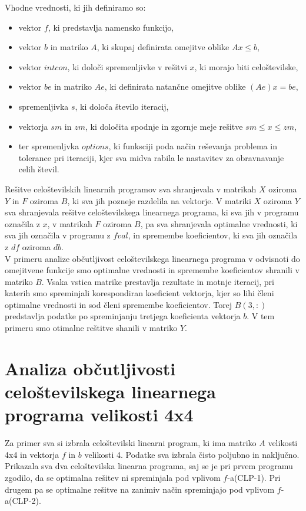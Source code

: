 \documentclass[a4paper,12pt]{article}
\begin{document}
Vhodne vrednosti, ki jih definiramo so:
\begin{itemize}
\item vektor $f$, ki predstavlja namensko funkcijo,
\item vektor $b$ in matriko $A$, ki skupaj definirata omejitve oblike $Ax \leq b$,
\item vektor $intcon$, ki določi spremenljivke v rešitvi $x$, ki morajo biti celoštevilske,
\item vektor $be$ in matriko $Ae$, ki definirata natančne omejitve oblike $(Ae)x=be$,
\item spremenljivka $s$, ki določa število iteracij,
\item vektorja $sm$ in $zm$, ki določita spodnje in zgornje meje rešitve $sm \leq x \leq zm$,
\item ter spremenljvka $options$, ki funksciji poda način reševanja problema in tolerance pri iteraciji, kjer sva midva rabila le nastavitev za obravnavanje celih števil.
\end{itemize}


Rešitve celoštevilskih linearnih programov sva shranjevala v matrikah $X$ oziroma $Y$ in $F$ oziroma $B$, ki sva jih pozneje razdelila na vektorje. V matriki $X$ oziroma $Y$ sva shranjevala rešitve celoštevilskega linearnega programa, ki sva jih v programu označila z $x$, v matrikah $F$ oziroma $B$, pa sva shranjevala optimalne vrednosti, ki sva jih označila v programu z $fval$, in spremembe koeficientov, ki sva jih označila z $df$ oziroma $db$.
\\[0.5cm]
V primeru analize občutljivost celoštevilskega linearnega programa v odvisnoti do omejitvene funkcije smo optimalne vrednosti in spremembe koeficientov shranili v matriko $B$. Vsaka vstica matrike prestavlja rezultate in motnje iteracij, pri katerih smo spreminjali korespondiran koeficient vektorja,  kjer so lihi členi optimalne vrednosti in sod členi spremembe koeficientov. Torej $B(3,:)$ predstavlja podatke po spreminjanju tretjega koeficienta vektorja $b$. V tem primeru smo otimalne reštitve shanili v matriko $Y$.


\section{Analiza občutljivosti celoštevilskega linearnega programa velikosti 4x4}

Za primer sva si izbrala celoštevilski linearni program, ki ima matriko $A$ velikosti 4x4 in vektorja $f$ in $b$ velikosti 4. Podatke sva izbrala čisto poljubno in naključno. Prikazala sva dva celoštevilska linearna programa, saj se je pri prvem programu zgodilo, da se optimalna rešitev ni spreminjala pod vplivom $f$-a(CLP-1). Pri drugem pa se optimalne rešitve na zanimiv način spreminjajo pod vplivom $f$-a(CLP-2).
\end{document}
